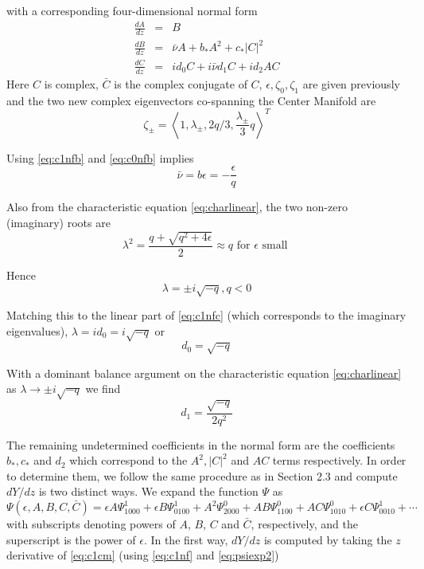 with  a corresponding four-dimensional normal form
\begin{subequations}\label{eq:c1nf}
\begin{eqnarray}
\frac{dA}{dz} &=& B  \label{eq:c1nfa} \\
\frac{dB}{dz} &=& \bar{\nu} A + b_* A^2 + c_* \left|C\right|^2  \label{eq:c1nfb} \\
\frac{dC}{dz} &=& i d_0 C + i \bar{\nu} d_1 C + i d_2 A C \label{eq:c1nfc}
\end{eqnarray}
\end{subequations}
Here $C$ is complex, $\bar{C}$ is the complex conjugate of $C$, $\epsilon, \zeta_0, \zeta_1$ are given previously and the two new
complex eigenvectors co-spanning the Center Manifold are
\begin{equation}
\zeta_\pm	 = \left< 1, \lambda_\pm, 2 q / 3, \frac{\lambda_\pm}{3} q\right>^T 
\end{equation}

Using \eqref{eq:c1nfb} and \eqref{eq:c0nfb} implies
\begin{equation}
\bar{\nu} = b \epsilon = -\frac{\epsilon}{q} 
\end{equation}

Also from the characteristic equation \eqref{eq:charlinear}, the two non-zero 
(imaginary) roots are 
\begin{equation}
\lambda^2 = \frac{ q + \sqrt{q^2 + 4 \epsilon } }{2} \approx q \textrm{ for } \epsilon \textrm{ small }
\end{equation}

Hence
\begin{equation}
\lambda = \pm i \sqrt{-q}, q < 0
\end{equation}

Matching this to the linear part of \eqref{eq:c1nfc} 
 (which corresponds to the imaginary eigenvalues), $\lambda = i d_0 = i \sqrt{-q}$ or 
\begin{equation}
d_0 = \sqrt{-q}
\end{equation}

With a dominant balance argument on the characteristic equation \eqref{eq:charlinear} as  $\lambda \rightarrow \pm i \sqrt{-q}$ we find
\begin{equation}
d_1 = \frac{\sqrt{-q}}{2 q^2} 
\end{equation}

The remaining undetermined coefficients  in the normal form are the
coefficients $b_*,c_*$ and $d_2$ which correspond to the $A^2, |C|^2$ and $AC$
terms respectively. In order to determine them, we follow the same procedure as
in Section 2.3 and compute $dY/dz$ is two distinct ways. We expand the function
$\Psi$ as
\begin{equation}\label{eq:psiexp2}
\Psi(\epsilon,A,B,C,\bar{C}) = \epsilon A \Psi_{1000}^1 + \epsilon B \Psi_{0100}^1 + A^2 \Psi_{2000}^0 + A B \Psi_{1100}^0 + A C \Psi_{1010}^0 + \epsilon C \Psi_{0010}^1 + \cdots 
\end{equation}
with subscripts denoting powers of $A$, $B$, $C$ and $\bar{C}$, respectively,
and the superscript is the power of $\epsilon$. In the first way, $dY/dz$ is
computed by taking the $z$ derivative of \eqref{eq:c1cm} (using \eqref{eq:c1nf}
and \eqref{eq:psiexp2})

